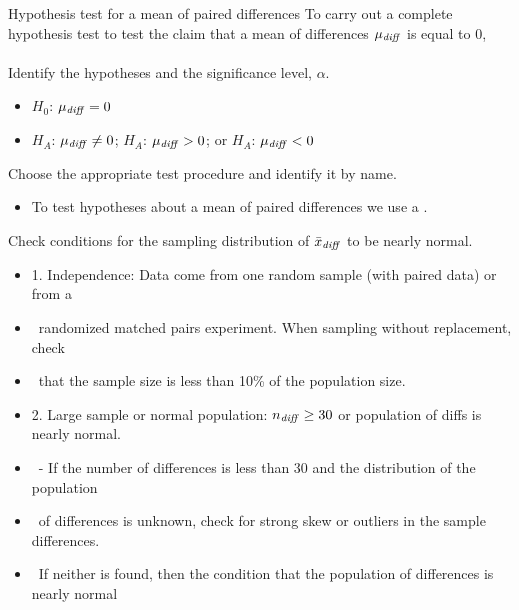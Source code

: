 






\begin{onebox}{Hypothesis test for a mean of paired differences}
To carry out a complete hypothesis test to test the claim that a mean of differences $\mu_{\text{\emph{diff}}}$ is equal to 0,
\\
\\
 Identify the hypotheses and the significance level, $\alpha$.\vspace{-1mm}
\begin{itemize}
\setlength{\itemsep}{0mm}
\item[] $H_0$: $\mu_{\text{\emph{diff}}} = 0$  
\item[]  $H_A$: $\mu_{\text{\emph{diff}}} \ne 0$;  \quad $H_A$: $\mu_{\text{\emph{diff}}} > 0$; \quad or \quad $H_A$: $\mu_{\text{\emph{diff}}} < 0$ 
\end{itemize} 
 Choose the appropriate test procedure and identify it by name.  \vspace{-1mm}
\begin{itemize}
\item[] To test hypotheses about a mean of paired differences we use a .
\end{itemize}
  Check conditions for the sampling distribution of $\bar{x}_{\text{\emph{diff}}}$ to be nearly normal.\vspace{-1mm}
\begin{itemize}
\setlength{\itemsep}{0mm}
\item[] 1. Independence:  Data come from one random sample (with paired data) or from a 
\item[] \ \quad randomized matched pairs experiment.  When sampling without replacement, check 
\item[] \ \quad that the sample size is less than 10\% of the population size.
\item[] 2. Large sample or normal population:  $n_{\text{\emph{diff}}}\ge 30$ or population of diffs is nearly normal.
 \item[] \quad \  - If the number of differences is less than 30 and the distribution of the population 
 \item[] \quad \ of differences is unknown, check for strong skew or outliers in the sample differences.
\item[] \quad \ If neither is found, then the condition that the population of differences is nearly normal 

\end{itemize}
\end{onebox}
